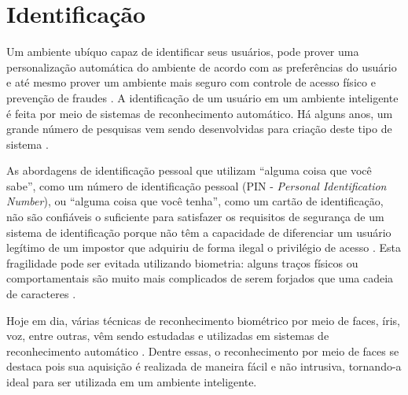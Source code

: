 	
	

	

\section{Identificação}
\label{sec:identificacao}
	
	Um ambiente ubíquo capaz de identificar seus usuários, pode prover uma
	personalização automática do ambiente de acordo com as preferências do usuário e
	até mesmo prover um ambiente mais seguro com controle de acesso físico e
	prevenção de fraudes \cite{saocarlos}. A identificação de um usuário em um
	ambiente inteligente é feita por meio de sistemas de reconhecimento automático.
	Há alguns anos, um grande número de pesquisas vem sendo desenvolvidas para criação
	deste tipo de sistema  \cite{saocarlos}.
	
	As abordagens de identificação pessoal que utilizam ``alguma coisa que você
	sabe'', como um número de identificação pessoal (PIN - \textit{Personal
	Identification Number}), ou ``alguma coisa que você tenha'', como um cartão de identificação,
	não são confiáveis o suficiente para satisfazer os requisitos de segurança de um
	sistema de identificação porque não têm a capacidade de diferenciar um usuário
	legítimo de um impostor que adquiriu de forma ilegal o privilégio de acesso
	\cite{hong}. Esta fragilidade pode ser evitada utilizando biometria: alguns
	traços físicos ou comportamentais são muito mais complicados de serem forjados
	que uma cadeia de caracteres \cite{drovetto}.
	
	Hoje em dia, várias técnicas de reconhecimento biométrico por meio de faces,
	íris, voz, entre outras, vêm sendo estudadas e utilizadas em sistemas de
	reconhecimento automático \cite{bolle}. Dentre essas, o reconhecimento por meio
	de faces se destaca pois sua aquisição é realizada de maneira fácil e não
	intrusiva, tornando-a ideal para ser utilizada em um ambiente inteligente.
	


	
	





























